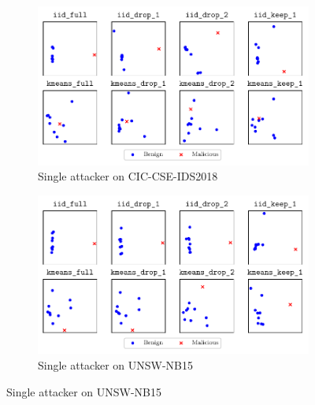 \begin{figure}
  \centering
  \begin{subfigure}[t]{0.48\linewidth}
    \centering
    \includegraphics[width=\linewidth]{figures/cicids/similarity-untargeted-single}
    \caption{
      Single attacker on CIC-CSE-IDS2018
      \label{fig:assess.similarity.single-cicids}
    }
  \end{subfigure}
  \hfill
  \begin{subfigure}[t]{0.48\linewidth}
    \centering
    \includegraphics[width=\linewidth]{figures/nb15/similarity-untargeted-single}
    \caption{
      Single attacker on UNSW-NB15
      \label{fig:assess.similarity.single-nb15}
    }
    \vspace{\baselineskip}
  \end{subfigure}


\end{figure}
